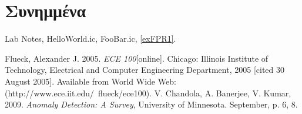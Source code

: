 \documentclass[a4paper, 11pt]{article}
\begin{document}
\section{}
\section*{Συνημμένα}
\ifx
Lab Notes, HelloWorld.ic, FooBar.ic,
\ref{exFPR1}.
\fi %


\begin{thebibliography}{9}
\ifx
{}  Flueck, Alexander J. 2005. \emph{ECE 100}[online]. Chicago: Illinois Institute of Technology, Electrical and Computer Engineering Department, 2005 [cited 30
August 2005]. Available from World Wide Web: (http://www.ece.iit.edu/~flueck/ece100).
\fi
{} V. Chandola, A. Banerjee, V. Kumar, 2009. \emph{Anomaly Detection: A Survey}, University of Minnesota. September, p. 6, 8.


\end{thebibliography}
\end{document}
